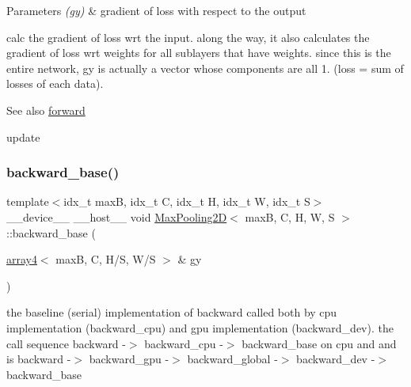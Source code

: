 \begin{DoxyParams}{Parameters}
{\em (gy)} & gradient of loss with respect to the output\\
\hline
\end{DoxyParams}
calc the gradient of loss wrt the input. along the way, it also calculates the gradient of loss wrt weights for all sublayers that have weights. since this is the entire network, gy is actually a vector whose components are all 1. (loss = sum of losses of each data). \begin{DoxySeeAlso}{See also}
\hyperlink{structMaxPooling2D_ac533b4e08d8f2e708bbdc8f8e2d784a2}{forward} 

update 
\end{DoxySeeAlso}
\mbox{\label{structMaxPooling2D_a3a2ce37cba46cc7cfd219e55bb3c2f29}} 
\subsubsection{\texorpdfstring{backward\+\_\+base()}{backward\_base()}}
{\footnotesize\ttfamily template$<$idx\+\_\+t maxB, idx\+\_\+t C, idx\+\_\+t H, idx\+\_\+t W, idx\+\_\+t S$>$ \\
\+\_\+\+\_\+device\+\_\+\+\_\+ \+\_\+\+\_\+host\+\_\+\+\_\+ void \hyperlink{structMaxPooling2D}{Max\+Pooling2D}$<$ maxB, C, H, W, S $>$\+::backward\+\_\+base (\begin{DoxyParamCaption}\item[{\hyperlink{structarray4}{array4}$<$ maxB, C, H/S, W/S $>$ \&}]{gy }\end{DoxyParamCaption})\hspace{0.3cm}{\ttfamily [inline]}}



the baseline (serial) implementation of backward called both by cpu implementation (backward\+\_\+cpu) and gpu implementation (backward\+\_\+dev). the call sequence backward -\/$>$ backward\+\_\+cpu -\/$>$ backward\+\_\+base on cpu and and is backward -\/$>$ backward\+\_\+gpu -\/$>$ backward\+\_\+global -\/$>$ backward\+\_\+dev -\/$>$ backward\+\_\+base 



